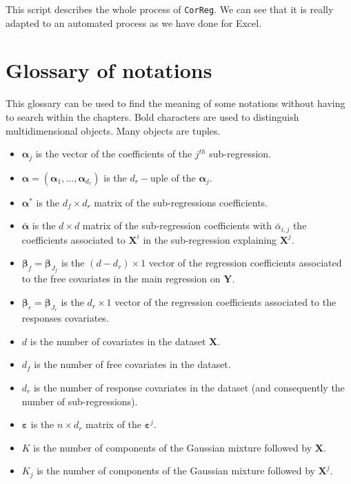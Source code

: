 \documentclass[12pt,a4paper]{report}
\begin{document}
\begin{appendices}
This script describes the whole process of {\tt CorReg}. We can see that it is really adapted to an automated process as we have done for Excel.



\chapter{Glossary of notations}
This glossary can be used to find the meaning of some notations without having to search within the chapters.
Bold characters are used to distinguish multidimensional objects. Many objects are tuples.
\begin{itemize}
	\item $\boldsymbol{\alpha}_j$ is the vector of the coefficients of the $j^{th}$ sub-regression.
	\item $\boldsymbol{\alpha}=(\boldsymbol{\alpha}_1,\dots,\boldsymbol{\alpha}_{d_r})$ is the $d_r-$uple of the $\boldsymbol{\alpha}_j$.
	\item $\boldsymbol{\alpha}^*$ is the $d_f \times d_r $ matrix of the sub-regressions coefficients.
	\item $\bar{\boldsymbol{\alpha}}$ is the $d\times d$ matrix of the sub-regression coefficients with $\bar{\alpha}_{i,j}$ the coefficients associated to $\boldsymbol{X}^i$ in the sub-regression explaining $\boldsymbol{X}^j$.
	\item $\boldsymbol{\beta}_f=\boldsymbol{\beta}_{J_f}$ is the $(d-d_r)\times 1$ vector of the regression coefficients associated  to the free covariates in the main regression on $\boldsymbol{Y}$.
	\item $\boldsymbol{\beta}_r=\boldsymbol{\beta}_{J_r}$ is the $d_r\times 1$ vector of the regression coefficients associated  to the responses covariates.
	\item $d$ is the number of covariates in the dataset $\boldsymbol{X}$.
	\item $d_f$ is the number of free covariates in the dataset.
	\item $d_r$ is the number of response covariates in the dataset (and consequently the number of sub-regressions).
	\item $\boldsymbol{\varepsilon}$ is the $n\times d_r$ matrix of the $\boldsymbol{\varepsilon}^j$.
	\item $K$ is the number of components of the Gaussian mixture followed by $\boldsymbol{X}$.
	\item $K_j$ is the number of components of the Gaussian mixture followed by $\boldsymbol{X}^j$.

\end{itemize}
\end{appendices}
\end{document}

